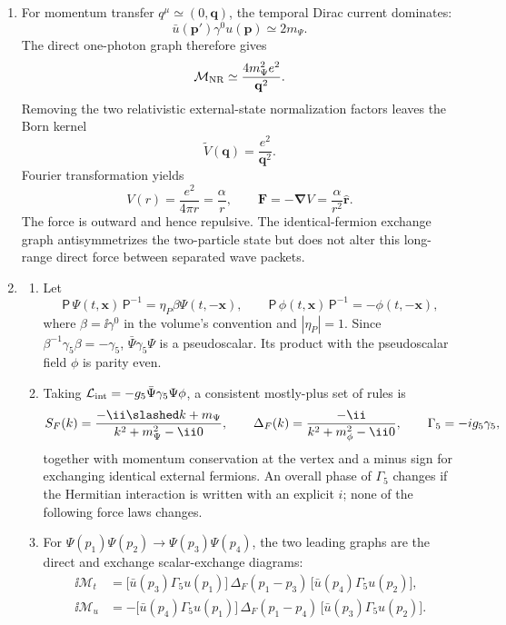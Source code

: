 \begin{enumerate}
\begin{enumerate}
\item
For momentum transfer \(q^\mu\simeq(0,\mathbf q)\), the temporal Dirac
current dominates:
\[
 \bar u(\mathbf p')\gamma^0u(\mathbf p)\simeq2m_\Psi.
\]
The direct one-photon graph therefore gives
\[
 \mathcal M_{\rm NR}
 \simeq\frac{4m_\Psi^2e^2}{\mathbf q^2}.
\]
Removing the two relativistic external-state normalization factors
leaves the Born kernel
\[
 \widetilde V(\mathbf q)=\frac{e^2}{\mathbf q^2}.
\]
Fourier transformation yields
\[
 V(r)=\frac{e^2}{4\pi r}=\frac{\alpha}{r},
\qquad
 \mathbf F=-\boldsymbol\nabla V
 =\frac{\alpha}{r^2}\widehat{\mathbf r}.
\]
The force is outward and hence repulsive.  The identical-fermion
exchange graph antisymmetrizes the two-particle state but does not
alter this long-range direct force between separated wave packets.
\item
\begin{enumerate}
\item
Let
\[
 \mathsf P\,\Psi(t,\mathbf x)\,\mathsf P^{-1}
 =\eta_P\beta\Psi(t,-\mathbf x),\qquad
 \mathsf P\,\phi(t,\mathbf x)\,\mathsf P^{-1}
 =-\phi(t,-\mathbf x),
\]
where \(\beta=\ii\gamma^0\) in the volume's convention and
\(|\eta_P|=1\).  Since
\(\beta^{-1}\gamma_5\beta=-\gamma_5\),
\(\bar\Psi\gamma_5\Psi\) is a pseudoscalar.  Its product with the
pseudoscalar field \(\phi\) is parity even.
\item
Taking \(\mathcal L_{\rm int}=-g_5\bar\Psi\gamma_5\Psi\phi\), a
consistent mostly-plus set of rules is
\[
 S_F(k)=\frac{-\ii\slashed k+m_\Psi}
 {k^2+m_\Psi^2-\ii0},\qquad
 \Delta_F(k)=\frac{-\ii}{k^2+m_\phi^2-\ii0},\qquad
 \Gamma_5=-ig_5\gamma_5,
\]
together with momentum conservation at the vertex and a minus sign
for exchanging identical external fermions.  An overall phase of
\(\Gamma_5\) changes if the Hermitian interaction is written with an
explicit \(i\); none of the following force laws changes.
\item
For
\(\Psi(p_1)\Psi(p_2)\to\Psi(p_3)\Psi(p_4)\), the two leading graphs are
the direct and exchange scalar-exchange diagrams:
\[
\begin{split}
 \ii\mathcal M_t
 &=\bigl[\bar u(p_3)\Gamma_5u(p_1)\bigr]\,
   \Delta_F(p_1-p_3)\,
   \bigl[\bar u(p_4)\Gamma_5u(p_2)\bigr],\\
 \ii\mathcal M_u
 &=-\bigl[\bar u(p_4)\Gamma_5u(p_1)\bigr]\,
   \Delta_F(p_1-p_4)\,
   \bigl[\bar u(p_3)\Gamma_5u(p_2)\bigr].
\end{split}
\]
\end{enumerate}
\end{enumerate}
\end{enumerate}
